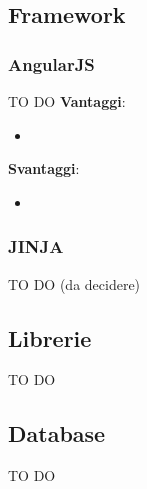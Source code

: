 
	\subsection{Framework} %
	\label{sub:framework}
		\subsubsection{AngularJS} %
		\label{ssub:angularjs}
		TO DO \newline
		\textbf{Vantaggi}:
			\begin{itemize}
				\item 
			\end{itemize}
			\noindent
		
		\textbf{Svantaggi}:
			\begin{itemize}
				\item 
			\end{itemize}
			\noindent

		\subsubsection{JINJA} %
		\label{ssub:jinja}
		TO DO (da decidere)


	\subsection{Librerie} %
	\label{sub:librerie}
	TO DO

	\subsection{Database} %
	\label{sub:database}
	TO DO


